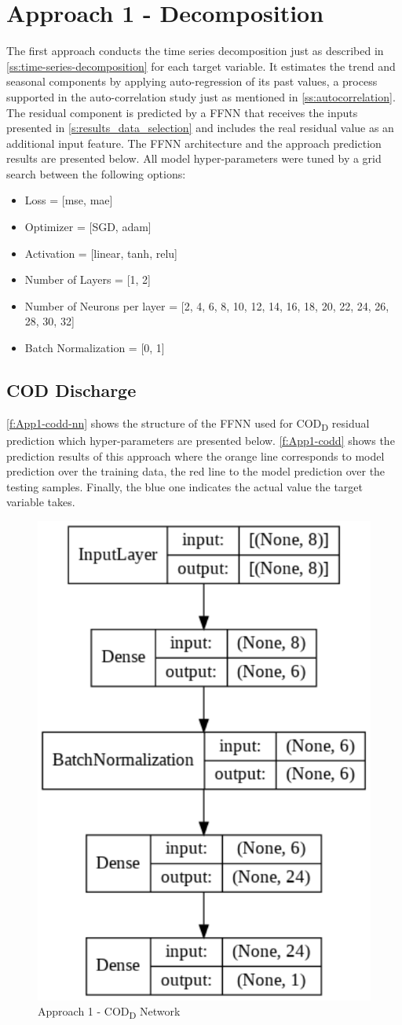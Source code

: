 \section{Approach 1 - Decomposition }
\label{s:resutls-approach1}
The first approach conducts the time series decomposition just as described in \autoref{ss:time-series-decomposition} for each target variable. It estimates the trend and seasonal components by applying auto-regression of its past values, a process supported in the auto-correlation study just as mentioned in \autoref{ss:autocorrelation}. The residual component is predicted by a \ac{FFNN} that receives the inputs presented in \autoref{s:results_data_selection} and includes the real residual value as an additional input feature. The \ac{FFNN} architecture and the approach prediction results are presented below.
All model hyper-parameters were tuned by a grid search between the following options:

\begin{itemize}
    \item Loss = [mse, mae]
    \item Optimizer = [SGD, adam]
    \item Activation = [linear, tanh, relu]
    \item Number of Layers = [1, 2]
    \item Number of Neurons per layer = [2, 4, 6, 8, 10, 12, 14, 16, 18, 20, 22, 24, 26, 28, 30, 32]
    \item Batch Normalization = [0, 1]
\end{itemize}

\subsection{COD Discharge}
\autoref{f:App1-codd-nn} shows the structure of the \ac{FFNN} used for \ac{COD}\textsubscript{D} residual prediction which hyper-parameters are presented below. \autoref{f:App1-codd} shows the prediction results of this approach where the orange line corresponds to model prediction over the training data, the red line to the model prediction over the testing samples. Finally, the blue one indicates the actual value the target variable takes.

\begin{figure}[h]
\centering
\includegraphics[width=0.4\linewidth]{figures/Ch5/App1_CODeq.pdf}
\caption{Approach 1 - COD\textsubscript{D} Network}
\label{f:App1-codd-nn}
\end{figure}

